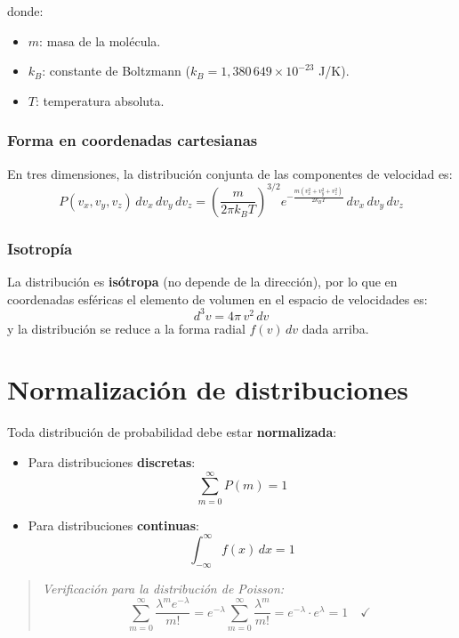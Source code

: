 donde:
\begin{itemize}
    \item $m$: masa de la molécula.
    \item $k_B$: constante de Boltzmann ($k_B = 1{,}380\,649 \times 10^{-23}$ J/K).
    \item $T$: temperatura absoluta.
\end{itemize}

\subsubsection{Forma en coordenadas cartesianas}

En tres dimensiones, la distribución conjunta de las componentes de velocidad es:
$$
P(v_x, v_y, v_z)\, dv_x\, dv_y\, dv_z = \left(\frac{m}{2\pi k_B T}\right)^{3/2} e^{-\frac{m(v_x^2 + v_y^2 + v_z^2)}{2k_B T}}\, dv_x\, dv_y\, dv_z
$$

\subsubsection{Isotropía}

La distribución es \textbf{isótropa} (no depende de la dirección), por lo que en coordenadas esféricas el elemento de volumen en el espacio de velocidades es:
$$
d^3 v = 4\pi\, v^2\, dv
$$
y la distribución se reduce a la forma radial $f(v)\,dv$ dada arriba.

\section{Normalización de distribuciones}

Toda distribución de probabilidad debe estar \textbf{normalizada}:

\begin{itemize}
    \item Para distribuciones \textbf{discretas}:
$$
\sum_{m=0}^{\infty} P(m) = 1
$$

    \item Para distribuciones \textbf{continuas}:
$$
\int_{-\infty}^{\infty} f(x)\, dx = 1
$$
\end{itemize}

\begin{quote}
\textit{Verificación para la distribución de Poisson:}
$$
\sum_{m=0}^{\infty} \frac{\lambda^m e^{-\lambda}}{m!} = e^{-\lambda} \sum_{m=0}^{\infty} \frac{\lambda^m}{m!} = e^{-\lambda} \cdot e^{\lambda} = 1 \quad \checkmark
$$
\end{quote}

